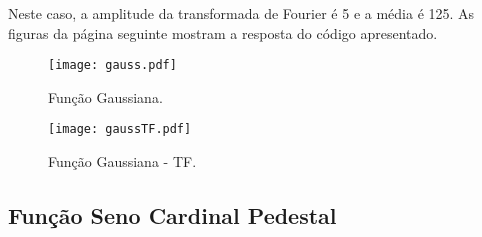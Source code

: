 Neste caso, a amplitude da transformada de Fourier é 5 e a média é 125. As figuras da página seguinte mostram a resposta do código apresentado.

\newpage

\begin{figure}[!ht]
    \centering
    \begin{minipage}[b]{0.49\textwidth}
        \centering
        \texttt{[image: gauss.pdf]}
        \caption{Função Gaussiana.}
    \end{minipage}
    \hfill
    \begin{minipage}[b]{0.49\textwidth}
        \centering
        \texttt{[image: gaussTF.pdf]}
        \caption{Função Gaussiana - TF.}
    \end{minipage}
\end{figure}

\subsection{Função Seno Cardinal \boldmath{$\rightarrow$} Pedestal}

